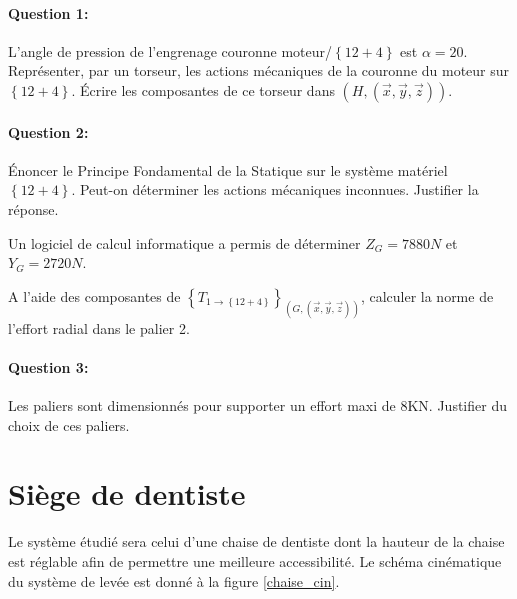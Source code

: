 \paragraph{Question 1:} L'angle de pression de l'engrenage couronne moteur/$\left\{12+4\right\}$ est $\alpha=20$\textdegree.
Représenter, par un torseur, les actions mécaniques de la couronne du moteur sur $\left\{12+4\right\}$.
Écrire les composantes de ce torseur dans $(H,(\overrightarrow{x},\overrightarrow{y},\overrightarrow{z}))$.

\paragraph{Question 2:} Énoncer le Principe Fondamental de la Statique sur le système matériel $\left\{12+4\right\}$. Peut-on déterminer les actions mécaniques inconnues. Justifier la réponse.

Un logiciel de calcul informatique a permis de déterminer $Z_G = 7880 N$ et $Y_G = 2720 N$.

A l'aide des composantes de $\left\{T_{1 \rightarrow \left\{12+4\right\}}\right\}_{(G,(\overrightarrow{x},\overrightarrow{y},\overrightarrow{z}))}$, calculer la norme de l'effort radial dans le palier 2.

\paragraph{Question 3:} Les paliers sont dimensionnés pour supporter un effort maxi de 8KN. Justifier du choix de ces paliers.

\newpage



%


\newpage

\section{Siège de dentiste}

Le système étudié sera celui d'une chaise de dentiste dont la hauteur de la chaise est réglable afin de permettre une meilleure accessibilité. Le schéma cinématique du système de levée est donné à la figure \ref{chaise_cin}.

